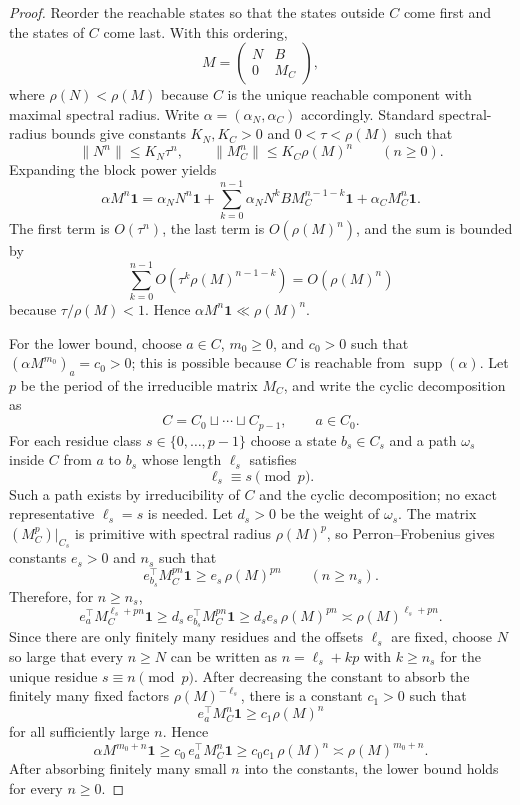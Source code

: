 \documentclass{etds}%
\numberwithin{equation}{section}
\theoremstyle{plain}
\theoremstyle{definition}
\theoremstyle{remark}
\begin{document}
\begin{proof}
Reorder the reachable states so that the states outside $C$ come first and the
states of $C$ come last.  With this ordering,
\[
M=
\begin{pmatrix}
N&B\\
0&M_C
\end{pmatrix},
\]
where $\rho(N)<\rho(M)$ because $C$ is the unique reachable component with
maximal spectral radius.  Write $\alpha=(\alpha_N,\alpha_C)$ accordingly.
Standard spectral-radius bounds give constants $K_N,K_C>0$ and
$0<\tau<\rho(M)$ such that
\[
\|N^n\|\le K_N\tau^n,
\qquad
\|M_C^n\|\le K_C\rho(M)^n
\qquad(n\ge 0).
\]
Expanding the block power yields
\[
\alpha M^n\mathbf{1}
=\alpha_NN^n\mathbf{1}
+\sum_{k=0}^{n-1}\alpha_NN^kBM_C^{n-1-k}\mathbf{1}
+\alpha_CM_C^n\mathbf{1}.
\]
The first term is $O(\tau^n)$, the last term is $O(\rho(M)^n)$, and the sum
is bounded by
\[
\sum_{k=0}^{n-1}O(\tau^k\rho(M)^{n-1-k})
=O(\rho(M)^n)
\]
because $\tau/\rho(M)<1$.  Hence $\alpha M^n\mathbf{1}\ll \rho(M)^n$.

For the lower bound, choose $a\in C$, $m_0\ge 0$, and $c_0>0$ such that
$(\alpha M^{m_0})_a=c_0>0$; this is possible because $C$ is reachable from
$\operatorname{supp}(\alpha)$.  Let $p$ be the period of the irreducible
matrix $M_C$, and write the cyclic decomposition as
\[
C=C_0\sqcup\cdots\sqcup C_{p-1},
\qquad a\in C_0.
\]
For each residue class $s\in\{0,\dots,p-1\}$ choose a state $b_s\in C_s$ and a
path $\omega_s$ inside $C$ from $a$ to $b_s$ whose length $\ell_s$ satisfies
\[
\ell_s\equiv s\pmod p.
\]
Such a path exists by irreducibility of $C$ and the cyclic decomposition; no
exact representative $\ell_s=s$ is needed.  Let $d_s>0$ be the weight of
$\omega_s$.  The matrix $(M_C^p)|_{C_s}$ is primitive with spectral radius
$\rho(M)^p$, so Perron--Frobenius gives constants $e_s>0$ and $n_s$ such that
\[
e_{b_s}^\top M_C^{pn}\mathbf{1}\ge e_s\,\rho(M)^{pn}
\qquad(n\ge n_s).
\]
Therefore, for $n\ge n_s$,
\[
e_a^\top M_C^{\ell_s+pn}\mathbf{1}
\ge d_s\,e_{b_s}^\top M_C^{pn}\mathbf{1}
\ge d_se_s\,\rho(M)^{pn}
\asymp \rho(M)^{\ell_s+pn}.
\]
Since there are only finitely many residues and the offsets $\ell_s$ are
fixed, choose $N$ so large that every $n\ge N$ can be written as
$n=\ell_s+kp$ with $k\ge n_s$ for the unique residue
$s\equiv n\pmod p$.  After decreasing the constant to absorb the finitely many
fixed factors $\rho(M)^{-\ell_s}$, there is a constant $c_1>0$ such that
\[
e_a^\top M_C^n\mathbf{1}\ge c_1\rho(M)^n
\]
for all sufficiently large $n$.  Hence
\[
\alpha M^{m_0+n}\mathbf{1}
\ge c_0\,e_a^\top M_C^n\mathbf{1}
\ge c_0c_1\,\rho(M)^n
\asymp \rho(M)^{m_0+n}.
\]
After absorbing finitely many small $n$ into the constants, the lower bound
holds for every $n\ge 0$.
\end{proof}
\end{document}
